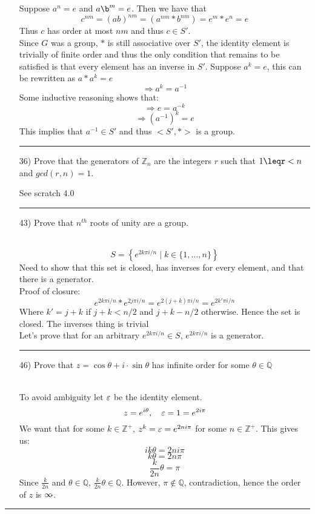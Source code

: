 \documentclass[11pt]{article}
\let\oriinfty=\infty
\def\infty{{\oriinfty\llap{\vrule height.24em depth-.2em width.2em}}}
\begin{document}
\begin{itemize}
\begin{solution}
        Suppose $a^n=e$ and $a\b^m=e$. Then we have that
        $$c^{nm}=(ab)^{nm}=\left(a^{nm}*b^{nm}\right)=e^m*e^n=e$$
        Thus $c$ has order at most $nm$ and thus $c\in S'$.\\
        Since $G$ was a group, $*$ is still associative over $S'$, the identity element is trivially of finite order and thus the only condition that remains to be satisfied is that every element has an inverse in $S'$.
        Suppose $a^k=e$, this can be rewritten as $a*a^k=e$
        $$\Rightarrow a^k=a^{-1}$$
        Some inductive reasoning shows that:
        $$\Rightarrow e=a^{-k}$$
        $$\Rightarrow \left(a^{-1}\right)^k = e$$
        This implies that $a^{-1}\in S'$ and thus $<S', *>$ is a group.
    \end{solution}
    \vspace{6pt}
    \hrule
    \vspace{6pt}
    \item[36)] Prove that the generators of $\mathbb{Z}_n$ are the integers $r$ such that $1\leqr<n$ and $gcd(r,n)=1$.
    \begin{solution} See scratch 4.0
    \end{solution}
    \vspace{6pt}
    \hrule
    \vspace{6pt}
    \item[43)] Prove that $n^{th}$ roots of unity are a group.\\
    \begin{solution} \hfill \\
        $$S=\left\{ e^{2k\pi i/n}\mid k\in \{1,\dots,n\} \right\}$$
        Need to show that this set is closed, has inverses for every element, and that there is a generator.\\
        Proof of closure:
        $$e^{2k\pi i/n} * e^{2j\pi i/n} = e^{2(j+k)\pi i/n} = e^{2k'\pi i/n}$$
        Where $k' = j+k$ if $j+k<n/2$ and $j+k-n/2$ otherwise. Hence the set is closed. The inverses thing is trivial\\
        Let's prove that for an arbitrary $e^{2k\pi i/n} \in S$, $e^{2k\pi i/n}$ is a generator.  
    \end{solution}
    \vspace{6pt}
    \hrule
    \vspace{6pt}
    \item[46)] Prove that $z=\cos\theta + i\cdot \sin\theta$ has infinite order for some $\theta \in \mathbb{Q}$\\
    \begin{solution} \hfill \\
        To avoid ambiguity let $\varepsilon$ be the identity element.
        $$z=e^{i\theta}, \quad \varepsilon=1=e^{2i\pi}$$
        We want that for some $k\in \mathbb{Z}^+$, $z^k=\varepsilon=e^{2ni\pi}$ for some $n\in \mathbb{Z}^+$. This gives us:
        $$ik\theta=2ni\pi$$
        $$k\theta=2n\pi$$
        $$\frac{k}{2n}\theta=\pi$$
        Since $\frac{k}{2n}$ and $\theta \in \mathbb{Q}$, $\frac{k}{2n}\theta \in \mathbb{Q}$. However, $\pi \notin \mathbb{Q}$, contradiction,
        hence the order of $z$ is $\infty$.
    \end{solution}
\end{itemize}
\vspace{6pt}
\hrule
\vspace{6pt}
\end{document}
